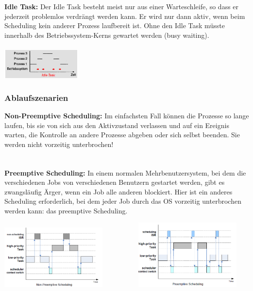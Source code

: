 \textbf{Idle Task:} Der Idle Task besteht meist nur aus einer Warteschleife, so dass er jederzeit
problemlos verdrängt werden kann. Er wird nur dann aktiv, wenn beim Scheduling kein anderer Prozess laufbereit ist. Ohne den Idle Task müsste innerhalb des Betriebssystem-Kerns gewartet werden
(busy waiting).\\\\
\includegraphics[width=0.3\textwidth]{images/Betriebssysteme/IdleTask.png}

\subsubsection{Ablaufszenarien}
\begin{multicols}{2}
\textbf{Non-Preemptive Scheduling:} Im einfachsten Fall können die Prozesse so lange laufen, bis sie von sich aus den Aktivzustand verlassen und auf ein Ereignis warten, die Kontrolle an andere Prozesse abgeben oder sich selbst beenden. Sie werden nicht vorzeitig unterbrochen!\\\\\\
\textbf{Preemptive Scheduling:}
In einem normalen Mehrbenutzersystem, bei dem die verschiedenen Jobs von verschiedenen Benutzern gestartet werden, gibt es zwangsläufig Ärger, wenn ein Job alle anderen blockiert. Hier ist ein anderes Scheduling erforderlich, bei dem jeder Job durch das OS vorzeitig unterbrochen werden kann: das preemptive Scheduling.
\end{multicols}
\begin{multicols}{2}
\includegraphics[width=0.4\textwidth]{images/Betriebssysteme/NonPreemptiveScheduling.png} \ \ \ \ \ \ \ \ \ \
\includegraphics[width=0.4\textwidth]{images/Betriebssysteme/PreemptiveScheduling.png}
\end{multicols}
